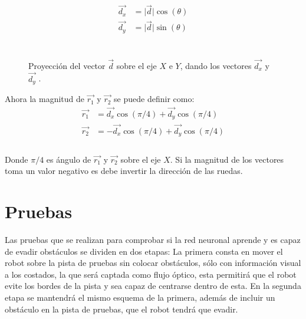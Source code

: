 \documentclass{iccmemoria}
\begin{document}
\begin{equation}
	\begin{split}
	\vec{d_{x}} & = \lvert \vec{d} \rvert \cos(\theta)\\
	\vec{d_{y}} & = \lvert \vec{d} \rvert \sin(\theta)\\
	\end{split}
\end{equation}\\

\begin{figure}[H]
  \centering
  \begin{large}
  
  \end{large}
  \caption[Proyección del vector $\vec{d}$ sobre el eje $X$ e $Y$.]{Proyección del vector $\vec{d}$ sobre el eje $X$ e $Y$, dando los vectores $\vec{d_{x}}$ y $\vec{d_{y}}$ .}
  \label{fig:vec_proyection}
\end{figure}

Ahora la magnitud de $\vec{r_{1}}$ y $\vec{r_{2}}$ se puede definir como:\\

\begin{equation}
	\begin{split}
	\vec{r_{1}} & = \vec{d_{x}}\cos(\pi/4)  + \vec{d_{y}}\cos(\pi/4)\\
	\vec{r_{2}} & = -\vec{d_{x}}\cos(\pi/4) + \vec{d_{y}}\cos(\pi/4)\\
	\end{split}
\end{equation}\\

Donde $\pi/4$ es ángulo de $\vec{r_{1}}$ y $\vec{r_{2}}$ sobre el eje $X$. Si la magnitud de los vectores toma un valor negativo es debe invertir la dirección de las ruedas.\\

\chapter{Pruebas}

Las pruebas que se realizan para comprobar si la red neuronal aprende y es capaz de evadir obstáculos se dividen en dos etapas: La primera consta en mover el robot sobre la pista de pruebas sin colocar obstáculos, sólo con información visual a los costados, la que será captada como flujo óptico, esta permitirá que el robot evite los bordes de la pista y sea capaz de centrarse dentro de esta. En la segunda etapa se mantendrá el mismo esquema de la primera, además de incluir un obstáculo en la pista de pruebas, que el robot tendrá que evadir.\\
\end{document}
